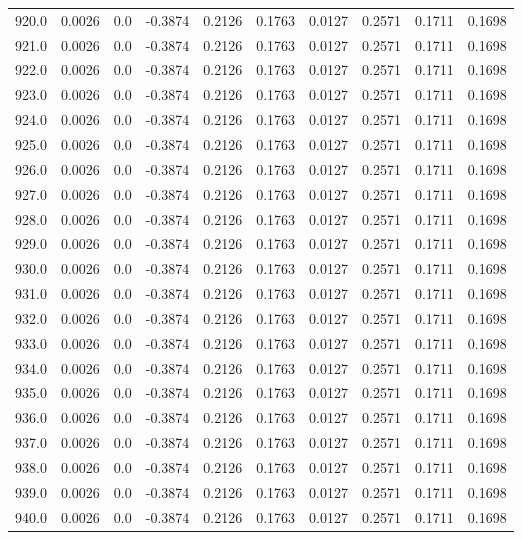 \begin{longtable}{lrrrrrrrrr}
920.0 & 0.0026 & 0.0 & -0.3874 & 0.2126 & 0.1763 & 0.0127 & 0.2571 & 0.1711 & 0.1698 \\
921.0 & 0.0026 & 0.0 & -0.3874 & 0.2126 & 0.1763 & 0.0127 & 0.2571 & 0.1711 & 0.1698 \\
922.0 & 0.0026 & 0.0 & -0.3874 & 0.2126 & 0.1763 & 0.0127 & 0.2571 & 0.1711 & 0.1698 \\
923.0 & 0.0026 & 0.0 & -0.3874 & 0.2126 & 0.1763 & 0.0127 & 0.2571 & 0.1711 & 0.1698 \\
924.0 & 0.0026 & 0.0 & -0.3874 & 0.2126 & 0.1763 & 0.0127 & 0.2571 & 0.1711 & 0.1698 \\
925.0 & 0.0026 & 0.0 & -0.3874 & 0.2126 & 0.1763 & 0.0127 & 0.2571 & 0.1711 & 0.1698 \\
926.0 & 0.0026 & 0.0 & -0.3874 & 0.2126 & 0.1763 & 0.0127 & 0.2571 & 0.1711 & 0.1698 \\
927.0 & 0.0026 & 0.0 & -0.3874 & 0.2126 & 0.1763 & 0.0127 & 0.2571 & 0.1711 & 0.1698 \\
928.0 & 0.0026 & 0.0 & -0.3874 & 0.2126 & 0.1763 & 0.0127 & 0.2571 & 0.1711 & 0.1698 \\
929.0 & 0.0026 & 0.0 & -0.3874 & 0.2126 & 0.1763 & 0.0127 & 0.2571 & 0.1711 & 0.1698 \\
930.0 & 0.0026 & 0.0 & -0.3874 & 0.2126 & 0.1763 & 0.0127 & 0.2571 & 0.1711 & 0.1698 \\
931.0 & 0.0026 & 0.0 & -0.3874 & 0.2126 & 0.1763 & 0.0127 & 0.2571 & 0.1711 & 0.1698 \\
932.0 & 0.0026 & 0.0 & -0.3874 & 0.2126 & 0.1763 & 0.0127 & 0.2571 & 0.1711 & 0.1698 \\
933.0 & 0.0026 & 0.0 & -0.3874 & 0.2126 & 0.1763 & 0.0127 & 0.2571 & 0.1711 & 0.1698 \\
934.0 & 0.0026 & 0.0 & -0.3874 & 0.2126 & 0.1763 & 0.0127 & 0.2571 & 0.1711 & 0.1698 \\
935.0 & 0.0026 & 0.0 & -0.3874 & 0.2126 & 0.1763 & 0.0127 & 0.2571 & 0.1711 & 0.1698 \\
936.0 & 0.0026 & 0.0 & -0.3874 & 0.2126 & 0.1763 & 0.0127 & 0.2571 & 0.1711 & 0.1698 \\
937.0 & 0.0026 & 0.0 & -0.3874 & 0.2126 & 0.1763 & 0.0127 & 0.2571 & 0.1711 & 0.1698 \\
938.0 & 0.0026 & 0.0 & -0.3874 & 0.2126 & 0.1763 & 0.0127 & 0.2571 & 0.1711 & 0.1698 \\
939.0 & 0.0026 & 0.0 & -0.3874 & 0.2126 & 0.1763 & 0.0127 & 0.2571 & 0.1711 & 0.1698 \\
940.0 & 0.0026 & 0.0 & -0.3874 & 0.2126 & 0.1763 & 0.0127 & 0.2571 & 0.1711 & 0.1698 \\

\end{longtable}
